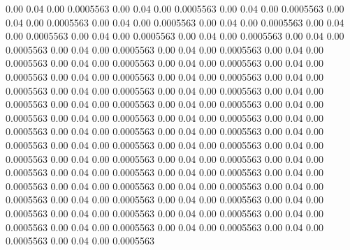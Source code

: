   0.00    0.04    0.00   0.0005563
   0.00    0.04    0.00   0.0005563
   0.00    0.04    0.00   0.0005563
   0.00    0.04    0.00   0.0005563
   0.00    0.04    0.00   0.0005563
   0.00    0.04    0.00   0.0005563
   0.00    0.04    0.00   0.0005563
   0.00    0.04    0.00   0.0005563
   0.00    0.04    0.00   0.0005563
   0.00    0.04    0.00   0.0005563
   0.00    0.04    0.00   0.0005563
   0.00    0.04    0.00   0.0005563
   0.00    0.04    0.00   0.0005563
   0.00    0.04    0.00   0.0005563
   0.00    0.04    0.00   0.0005563
   0.00    0.04    0.00   0.0005563
   0.00    0.04    0.00   0.0005563
   0.00    0.04    0.00   0.0005563
   0.00    0.04    0.00   0.0005563
   0.00    0.04    0.00   0.0005563
   0.00    0.04    0.00   0.0005563
   0.00    0.04    0.00   0.0005563
   0.00    0.04    0.00   0.0005563
   0.00    0.04    0.00   0.0005563
   0.00    0.04    0.00   0.0005563
   0.00    0.04    0.00   0.0005563
   0.00    0.04    0.00   0.0005563
   0.00    0.04    0.00   0.0005563
   0.00    0.04    0.00   0.0005563
   0.00    0.04    0.00   0.0005563
   0.00    0.04    0.00   0.0005563
   0.00    0.04    0.00   0.0005563
   0.00    0.04    0.00   0.0005563
   0.00    0.04    0.00   0.0005563
   0.00    0.04    0.00   0.0005563
   0.00    0.04    0.00   0.0005563
   0.00    0.04    0.00   0.0005563
   0.00    0.04    0.00   0.0005563
   0.00    0.04    0.00   0.0005563
   0.00    0.04    0.00   0.0005563
   0.00    0.04    0.00   0.0005563
   0.00    0.04    0.00   0.0005563
   0.00    0.04    0.00   0.0005563
   0.00    0.04    0.00   0.0005563
   0.00    0.04    0.00   0.0005563
   0.00    0.04    0.00   0.0005563
   0.00    0.04    0.00   0.0005563
   0.00    0.04    0.00   0.0005563
   0.00    0.04    0.00   0.0005563
   0.00    0.04    0.00   0.0005563
   0.00    0.04    0.00   0.0005563
   0.00    0.04    0.00   0.0005563
   0.00    0.04    0.00   0.0005563
